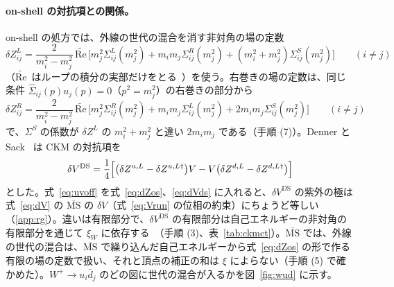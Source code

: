 \documentclass[a4paper,10pt]{ltjsarticle}
\newcommand{\MSbar}{\overline{\mathrm{MS}}}
\newcommand{\re}{\mathrm{Re}\,}
\begin{document}
\paragraph{on-shell の対抗項との関係。}on-shell の処方では、外線の世代の混合を消す非対角の場の定数
\begin{equation}
\delta Z^L_{ij}=\frac2{m_i^2-m_j^2}\,\widetilde{\re}\bigl[m_j^2\Sigma^L_{ij}(m_j^2)+m_im_j\Sigma^R_{ij}(m_j^2)+(m_i^2+m_j^2)\Sigma^S_{ij}(m_j^2)\bigr]\qquad(i\ne j)
\label{eq:dZos}
\end{equation}
（$\widetilde{\re}$ はループの積分の実部だけをとる~\cite{denner93}）を使う。右巻きの場の定数は、同じ条件 $\hat\Sigma_{ij}(p)u_j(p)=0$（$p^2=m_j^2$）の右巻きの部分から
\begin{equation}
\delta Z^R_{ij}=\frac2{m_i^2-m_j^2}\,\widetilde{\re}\bigl[m_j^2\Sigma^R_{ij}(m_j^2)+m_im_j\Sigma^L_{ij}(m_j^2)+2m_im_j\Sigma^S_{ij}(m_j^2)\bigr]\qquad(i\ne j)
\label{eq:dZRos}
\end{equation}
で、$\Sigma^S$ の係数が $\delta Z^L$ の $m_i^2+m_j^2$ と違い $2m_im_j$ である（手順 (7)）。Denner と Sack~\cite{ds90} は CKM の対抗項を
\begin{equation}
\delta V^{\mathrm{DS}}=\frac14\Bigl[\bigl(\delta Z^{u,L}-\delta Z^{u,L\dagger}\bigr)V-V\bigl(\delta Z^{d,L}-\delta Z^{d,L\dagger}\bigr)\Bigr]
\label{eq:dVds}
\end{equation}
とした。式~\eqref{eq:uvoff} を式~\eqref{eq:dZos}、\eqref{eq:dVds} に入れると、$\delta V^{\mathrm{DS}}$ の紫外の極は式~\eqref{eq:dV} の $\MSbar$ の $\delta V$（式~\eqref{eq:Vrun} の位相の約束）にちょうど等しい（\ref{app:rg}）。違いは有限部分で、$\delta V^{\mathrm{DS}}$ の有限部分は自己エネルギーの非対角の有限部分を通じて $\xi_W$ に依存する~\cite{ggm99,yamada01}（手順 (3)、表~\ref{tab:ckmct}）。$\MSbar$ では、外線の世代の混合は、$\MSbar$ で繰り込んだ自己エネルギーから式~\eqref{eq:dZos} の形で作る有限の場の定数で扱い、それと頂点の補正の和は $\xi$ によらない（手順 (5) で確かめた）。$W^+\to u_i\bar d_j$ のどの図に世代の混合が入るかを図~\ref{fig:wud} に示す。
\end{document}

